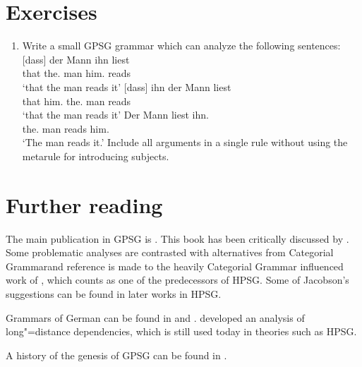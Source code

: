 \section*{Exercises}

\begin{enumerate}
\item Write a small GPSG grammar which can analyze the following sentences:
\eal
\ex 
\gll {}[dass] der Mann ihn liest\\
	 {}\spacebr{}that the.\nom{} man him.\acc{} reads\\
\glt `that the man reads it'
\ex 
\gll {}[dass] ihn der Mann liest\\
	{}\spacebr{}that him.\acc{} the.\nom{} man reads\\
\glt `that the man reads it'
\ex 
\gll Der Mann liest ihn.\\
     the.\nom{} man reads him.\acc\\
\glt `The man reads it.'
\zl
Include all arguments in a single rule without using the metarule for introducing subjects.
\end{enumerate}

\section*{Further reading}

The main publication in GPSG is . This book has been critically discussed by \citet{Jacobson87b}. Some problematic analyses
are contrasted with alternatives from Categorial Grammar\indexcg and reference is made to the heavily Categorial Grammar influenced work of \citet{Pollard84a-u}, which
counts as one of the predecessors of HPSG. Some of Jacobson's suggestions can be found in later works in HPSG.

Grammars of German can be found in  and . \citet{Gazdar81} developed an analysis of long"=distance dependencies, which
is still used today in theories such as HPSG.

A history of the genesis of GPSG can be found in .



